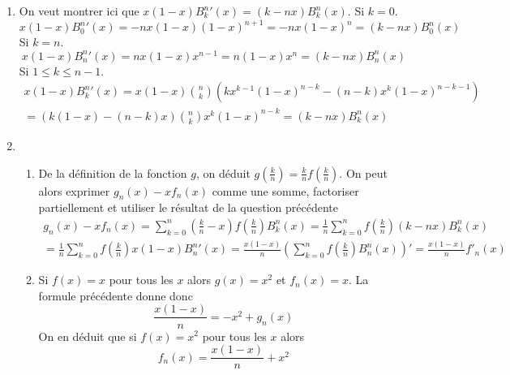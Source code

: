 \begin{enumerate}
\item  On veut montrer ici que $x(1-x){B^n_k}'(x) = (k-nx)B^n_k(x)$.\newline
Si $k=0$.
\begin{displaymath}
 x(1-x){B^n_0}'(x) = -nx(1-x)(1-x)^{n+1} = -nx(1-x)^n = (k-nx)B^n_0(x)
\end{displaymath}
Si $k=n$.
\begin{displaymath}
 x(1-x){B^n_n}'(x) = nx(1-x)x^{n-1} = n(1-x)x^n =(k-nx)B^n_n(x)
\end{displaymath}
Si $1\leq k \leq n-1$.
\begin{multline*}
 x(1-x){B^n_k}'(x) = x(1-x)\binom{n}{k}\left(kx^{k-1}(1-x)^{n-k} -(n-k)x^{k}(1-x)^{n-k-1} \right) \\
= \left( k(1-x)-(n-k)x\right) \binom{n}{k}x^{k}(1-x)^{n-k}
= (k-nx) B^n_k(x)
\end{multline*}

\item
\begin{enumerate}
\item De la définition de la fonction $g$, on déduit $g(\frac{k}{n})=\frac{k}{n}f(\frac{k}{n})$. On peut alors exprimer $g_n(x)-xf_n(x)$ comme une somme, factoriser partiellement et utiliser le résultat de la question précédente
\begin{multline*}
g_n(x)-xf_n(x) =
\sum_{k=0}^n\left(\frac{k}{n}-x \right)f(\frac{k}{n})B^n_k(x)
= \frac{1}{n}\sum_{k=0}^nf(\frac{k}{n})\left(k-nx \right)B^n_k(x)\\
= \frac{1}{n}\sum_{k=0}^nf(\frac{k}{n})x(1-x){B^n_n}'(x)
= \frac{x(1-x)}{n}\left( \sum_{k=0}^nf(\frac{k}{n}){B^n_n}(x)\right)' 
= \frac{x(1-x)}{n}f'_n(x)
\end{multline*}

\item  Si $f(x)=x$ pour tous les $x$ alors $g(x)=x^{2}$ et $f_{n}(x)=x$. La formule pr{\'e}c{\'e}dente donne donc
\begin{displaymath}
 \frac{x(1-x)}{n}=-x^{2}+g_{n}(x)
\end{displaymath}
On en d{\'e}duit que si $f(x)=x^{2}$ pour tous les $x$ alors
\begin{displaymath}
f_{n}(x)=\frac{x(1-x)}{n}+x^{2} 
\end{displaymath}


\end{enumerate}
\end{enumerate}

